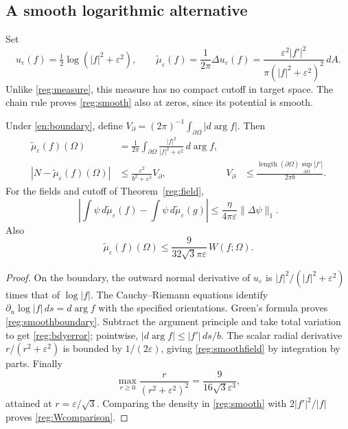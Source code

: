 \subsection{A smooth logarithmic alternative}
Set
\begin{equation}\label{reg:smooth}
 u_\varepsilon(f)=\tfrac12\log(|f|^2+\varepsilon^2),\qquad
 \widetilde\mu_\varepsilon(f)
 =\frac1{2\pi}\Delta u_\varepsilon(f)
 =\frac{\varepsilon^2|f'|^2}
        {\pi(|f|^2+\varepsilon^2)^2}\,dA.
\end{equation}
Unlike \eqref{reg:measure}, this measure has no compact cutoff in target
space. The chain rule proves \eqref{reg:smooth} also at zeros, since its
potential is smooth.

\begin{proposition}\label{reg:smoothbounds}
Under \eqref{en:boundary}, define
$V_{\partial}=(2\pi)^{-1}\int_{\partial\Omega}|d\arg f|$. Then
\begin{align}
 \widetilde\mu_\varepsilon(f)(\Omega)
 &=\frac1{2\pi}\int_{\partial\Omega}
            \frac{|f|^2}{|f|^2+\varepsilon^2}\,d\arg f,
       \label{reg:smoothboundary}\\
 |N-\widetilde\mu_\varepsilon(f)(\Omega)|
 &\le\frac{\varepsilon^2}{b^2+\varepsilon^2}V_{\partial},
 &V_{\partial}&\le
 \frac{\operatorname{length}(\partial\Omega)\sup_{\partial\Omega}|f'|}
      {2\pi b}. \label{reg:bdyerror}
\end{align}
For the fields and cutoff of Theorem~\ref{reg:field},
\begin{equation}\label{reg:smoothfield}
 \left|\int\psi\,d\widetilde\mu_\varepsilon(f)
       -\int\psi\,d\widetilde\mu_\varepsilon(g)\right|
 \le\frac{\eta}{4\pi\varepsilon}\|\Delta\psi\|_1.
\end{equation}
Also
\begin{equation}\label{reg:Wcomparison}
 \widetilde\mu_\varepsilon(f)(\Omega)
 \le\frac{9}{32\sqrt3\pi\varepsilon}\,W(f;\Omega).
\end{equation}
\end{proposition}
\begin{proof}
On the boundary, the outward normal derivative of $u_\varepsilon$
is $|f|^2/(|f|^2+\varepsilon^2)$ times that of $\log|f|$.
The Cauchy--Riemann equations identify
$\partial_n\log|f|\,ds=d\arg f$ with the specified orientations.
Green's formula proves \eqref{reg:smoothboundary}. Subtract the argument
principle and take total variation to get \eqref{reg:bdyerror}; pointwise,
$|d\arg f|\le |f'|\,ds/b$.
The scalar radial derivative $r/(r^2+\varepsilon^2)$ is bounded by
$1/(2\varepsilon)$, giving \eqref{reg:smoothfield} by integration by
parts. Finally
\[
 \max_{r\ge0}\frac{r}{(r^2+\varepsilon^2)^2}
 =\frac{9}{16\sqrt3\varepsilon^3},
\]
attained at $r=\varepsilon/\sqrt3$. Comparing the density in
\eqref{reg:smooth} with $2|f'|^2/|f|$ proves
\eqref{reg:Wcomparison}.
\end{proof}

